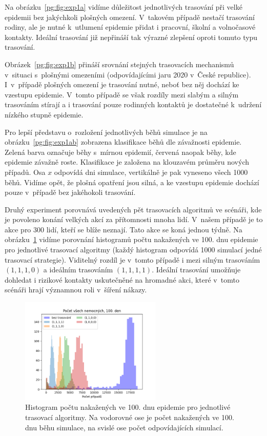 Na obrázku~\ref{pg:fig:exp1a} vidíme důležitost jednotlivých trasování při
velké epidemii bez jakýchkoli plošných omezení. V~takovém případě
nestačí trasování rodiny, ale je nutné k~utlumení epidemie přidat i
pracovní, školní a volnočasové kontakty. Ideální trasování již
nepřináší tak výrazné zlepšení oproti tomuto typu trasování.

Obrázek~\ref{pg:fig:exp1b} přináší srovnání stejných trasovacích
mechanismů v~situaci s~plošný\-mi omezeními (odpovídajícími jaru 2020
v~České republice). I~v~případě plošných omezení je trasování nutné,
neboť bez něj dochází ke vzestupu epidemie. V~tomto případě
se však rozdíly mezi slabým a silným trasováním stírají a i trasování
pouze rodinných kontaktů je dostatečné k~udržení nízkého stupně epidemie. 

Pro lepší představu o~rozložení jednotlivých běhů simulace je na
obrázku~\ref{pg:fig:exp1ab} zobrazena klasifikace běhů dle závažnosti
epidemie. Zelená barva označuje běhy s~mírnou epidemií, červená naopak běhy,
kde epidemie závažně roste. Klasifikace je založena na klouzavém průměru
nových případů. Osa $x$ odpovídá dni simulace, vertikálně je pak vyneseno
všech 1000 běhů. Vidíme opět, že plošná opatření jsou silná, a ke vzestupu
epidemie dochází pouze v~případě bez jakéhokoli trasování. 


Druhý experiment porovnává uvedených pět trasovacích algoritmů ve
scénáři, kde je povoleno konání velkých akcí za přítomnosti mnoha
lidí. V~našem případě je to akce pro 300 lidí, kteří se blíže
neznají. Tato akce se koná jednou týdně. Na obrázku~\ref{pg:fig:exp2}
vidíme porovnání histogramů počtu nakažených ve 100. dnu epidemie pro
jednotlivé trasovací algoritmy (každý histogram odpovídá 1000
simulací jedné trasovací strategie). Viditelný rozdíl je v~tomto
případě i mezi silným trasováním $(1, 1, 1, 0)$ a ideálním trasováním
$(1, 1, 1, 1)$. Ideální trasování umožňuje dohledat i rizikové
kontakty uskutečněné na hromadné akci, které v~tomto scénáři hrají
významnou roli v~šíření nákazy.

\begin{figure}[ht!]
  \centering
  \includegraphics[width=0.6\textwidth]{pic/histogram_party2.png}
  \caption{Histogram  počtu nakažených ve 100. dnu epidemie pro jednotlivé trasovací algoritmy.
  Na vodorovné ose je počet nakažených ve 100. dnu běhu simulace, na svislé ose počet odpovídajících simulací.}
  \label{pg:fig:exp2}
\end{figure}


